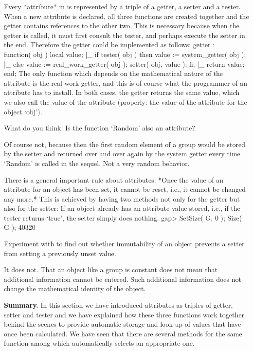 Every *attribute* in  {\GAP} is represented by  a triple  of a getter,  a
setter   and a  tester.  When a  new  attribute  is  declared, all  three
functions are created together and  the getter contains references to the
other two.  This is necessary because when  the getter is called, it must
first  consult the tester,   and perhaps execute the  setter  in the end.
Therefore the getter could be implemented as follows:
\begintt
    getter := function( obj )
    local   value;
|_
        if tester( obj )  then
            value := system_getter( obj );
|_
        else
            value := real_work_getter( obj );
            setter( obj, value );
        fi;
|_
        return value;
    end;
\endtt
The  only  function which  depends on   the  mathematical  nature  of the
attribute  is  the  real-work getter,  and this   is  of course  what the
programmer of  an  attribute has to  install.  In both cases,  the getter
returns  the same value, which  we also call  the  value of the attribute
(properly: the value of the attribute for the object `obj').

\exercise  What  do you think:  Is  the {\GAP} function  `Random' also an
attribute?

\answer Of course  not, because then the  first random element of a group
would be stored by  the setter and returned over  and  over again by  the
system getter every  time `Random' is  called in  the sequel.  Not a very
random behavior.

There is a general important rule about attributes: *Once the value of an
attribute for an object has been set, it cannot be reset, i.e., it cannot
be changed any more.* This is achieved by having two methods not only for
the getter but also for the setter: If an object already has an attribute
value stored, i.e., if the tester  returns `true', the setter simply does
nothing.
\beginexample
    gap> SetSize( G, 0 ); Size( G );
    40320
\endexample

\exercise Experiment  with {\GAP} to  find out whether immutability of an
object prevents a setter from setting a previously unset value.

\answer It does  not. That an  object like a  group is constant  does not
mean  that   additional information cannot    be entered. Such additional
information does not change the mathematical identity of the object.

{\bf  Summary.} In this section  we have introduced attributes as triples
of getter, setter   and tester and    we have explained how  these  three
functions work together behind  the  scenes to provide automatic  storage
and look-up of  values that have once been  calculated. We have seen that
there  are  several  methods for  the   same function  among which {\GAP}
automatically selects an appropriate one.

